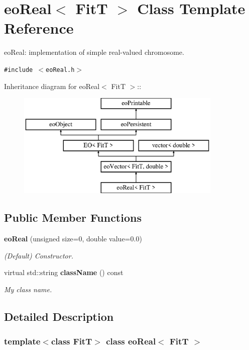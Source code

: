\section{eo\-Real$<$ Fit\-T $>$ Class Template Reference}
\label{classeo_real}
eo\-Real: implementation of simple real-valued chromosome.  


{\tt \#include $<$eo\-Real.h$>$}

Inheritance diagram for eo\-Real$<$ Fit\-T $>$::\begin{figure}[H]
\begin{center}
\leavevmode
\includegraphics[height=5cm]{classeo_real}
\end{center}
\end{figure}
\subsection*{Public Member Functions}
\begin{CompactItemize}
\item 
{\bf eo\-Real} (unsigned size=0, double value=0.0)
\begin{CompactList}\small\item\em (Default) Constructor. \item\end{CompactList}\item 
virtual std::string {\bf class\-Name} () const \label{classeo_real_a1}

\begin{CompactList}\small\item\em My class name. \item\end{CompactList}\end{CompactItemize}


\subsection{Detailed Description}
\subsubsection*{template$<$class Fit\-T$>$ class eo\-Real$<$ Fit\-T $>$}

